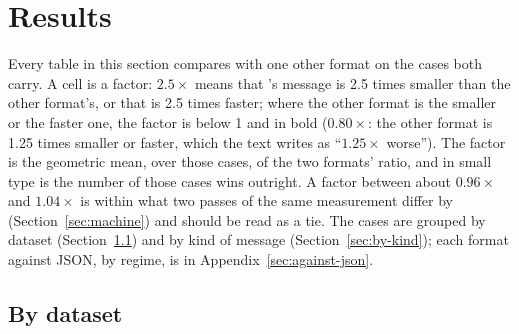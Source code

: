 \section{Results}
\label{sec:results}

Every table in this section compares \colbin{} with one other format on the
cases both carry. A cell is a factor: $2.5\times$ means that \colbin{}'s
message is 2.5 times smaller than the other format's, or that \colbin{} is
2.5 times faster; where the other format is the smaller or the faster one,
the factor is below 1 and in bold ($\mathbf{0.80\times}$: the other format
is 1.25 times smaller or faster, which the text writes as
``$1.25\times$ worse''). The
factor is the geometric
mean, over those cases, of the two formats' ratio, and in small type is the
number of those cases \colbin{} wins outright. A factor between about
$0.96\times$ and $1.04\times$ is within what two passes of the same measurement
differ by (Section~\ref{sec:machine}) and should be read as a tie. The
cases are grouped by dataset (Section~\ref{sec:by-dataset}) and by kind of
message (Section~\ref{sec:by-kind}); each format against JSON, by regime, is
in Appendix~\ref{sec:against-json}.

\newcommand{\vscell}[1]{\result{#1.cell}\ {\scriptsize \result{#1.wins}/\result{#1.n}}}
\newcommand{\vs}[1]{\result{vs.#1.factor}}

\FloatBarrier
\subsection{By dataset}
\label{sec:by-dataset}

\begin{table}[t]
\centering\scriptsize
\setlength{\tabcolsep}{2pt}
\caption{Size by dataset: how many times smaller \colbin{}'s message is than
each format's, as written and under gzip, on the cases both carry
($\dagger$: cases where \colbin{} writes zero bytes are left out of the
mean), and in small type the cases in which \colbin{} is strictly smaller.
Bold, below 1: the other format is the smaller one.}
\label{tab:versus-datasets-size}
\end{table}

\begin{table}[t]
\centering\scriptsize
\setlength{\tabcolsep}{2pt}
\caption{Time by dataset: how many times faster \colbin{} is than each
format, to encode and to decode into a fresh value, on the cases both carry,
and the cases in which \colbin{} is strictly faster. Bold, below 1: the
other format is the faster one.}
\label{tab:versus-datasets-time}
\end{table}

